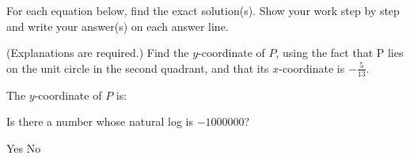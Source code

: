 \documentclass[11pt,answers]{exam}
\begin{document}

\begin{questions}


\addpoints

        
\question  For each equation below, find the exact solution(s). Show your work step by step and write your answer(s) on each answer line.


\question[2] (Explanations are required.) Find the $y$-coordinate of $P$, using the fact that P lies on the unit circle in the second quadrant, and that its $x$-coordinate is $\displaystyle -\frac{5}{13}$.

\fillwithdottedlines{0.8in}

The $y$-coordinate of $P$ is:\dotfill

\bonusquestion[1] Is there a number whose natural log is $-1000000$?
\begin{oneparchoices}
\choice Yes \choice No
\end{oneparchoices}


\end{questions}
\end{document}
